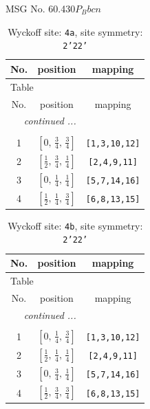 \documentclass[fleqn,8pt]{jsarticle}
\begin{document}
\setcounter{MaxMatrixCols}{32}

\renewcommand{\tablename}{Table~}
\renewcommand{\figurename}{Figure~}
\begin{center}
\LARGE
MSG No. 60.430\quad$P_{B}bcn$
\end{center}
\renewcommand{\arraystretch}{1.2}
\begin{longtable}{ccc}
\caption{Wyckoff site: {\tt 4a}, site symmetry: {\tt 2'22'}}
 \\
 \hline \hline
No. & position & mapping \\ \hline \endfirsthead

\multicolumn{2}{l}{\tablename\ \thetable{}} \\
 \hline \hline
No. & position & mapping \\ \hline \endhead

 \hline \hline
\multicolumn{2}{r}{\footnotesize\it continued ...} \\ \endfoot

 \hline \hline
\multicolumn{2}{r}{} \\ \endlastfoot

1 & $\left[ 0,\, \frac{3}{4},\, \frac{3}{4} \right]$ & {\tt [1,3,10,12]} \\ \hline
2 & $\left[ \frac{1}{2},\, \frac{3}{4},\, \frac{1}{4} \right]$ & {\tt [2,4,9,11]} \\ \hline
3 & $\left[ 0,\, \frac{1}{4},\, \frac{1}{4} \right]$ & {\tt [5,7,14,16]} \\ \hline
4 & $\left[ \frac{1}{2},\, \frac{1}{4},\, \frac{3}{4} \right]$ & {\tt [6,8,13,15]} \\
\end{longtable}
\renewcommand{\arraystretch}{1.2}
\begin{longtable}{ccc}
\caption{Wyckoff site: {\tt 4b}, site symmetry: {\tt 2'22'}}
 \\
 \hline \hline
No. & position & mapping \\ \hline \endfirsthead

\multicolumn{2}{l}{\tablename\ \thetable{}} \\
 \hline \hline
No. & position & mapping \\ \hline \endhead

 \hline \hline
\multicolumn{2}{r}{\footnotesize\it continued ...} \\ \endfoot

 \hline \hline
\multicolumn{2}{r}{} \\ \endlastfoot

1 & $\left[ 0,\, \frac{1}{4},\, \frac{3}{4} \right]$ & {\tt [1,3,10,12]} \\ \hline
2 & $\left[ \frac{1}{2},\, \frac{1}{4},\, \frac{1}{4} \right]$ & {\tt [2,4,9,11]} \\ \hline
3 & $\left[ 0,\, \frac{3}{4},\, \frac{1}{4} \right]$ & {\tt [5,7,14,16]} \\ \hline
4 & $\left[ \frac{1}{2},\, \frac{3}{4},\, \frac{3}{4} \right]$ & {\tt [6,8,13,15]} \\
\end{longtable}
\end{document}
